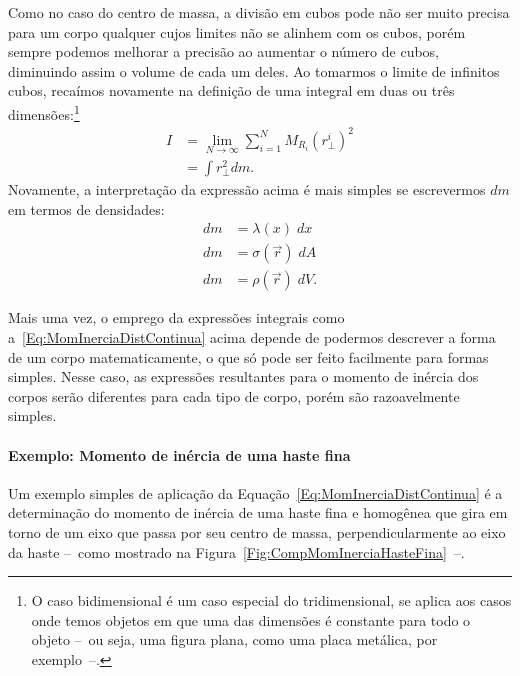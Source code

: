 Como no caso do centro de massa, a divisão em cubos pode não ser muito precisa para um corpo qualquer cujos limites não se alinhem com os cubos, porém sempre podemos melhorar a precisão ao aumentar o número de cubos, diminuindo assim o volume de cada um deles. Ao tomarmos o limite de infinitos cubos, recaímos novamente na definição de uma integral em duas ou três dimensões:\footnote{O caso bidimensional é um caso especial do tridimensional, se aplica aos casos onde temos objetos em que uma das dimensões é constante para todo o objeto --~ou seja, uma figura plana, como uma placa metálica, por exemplo~--.}
\begin{align}
    I &= \lim_{N \to \infty} \sum_{i = 1}^N M_{R_i} (r_\perp^i)^2 \\
    &= \int r_\perp^2 dm. \label{Eq:MomInerciaDistContinua}
\end{align}
%
Novamente, a interpretação da expressão acima é mais simples se escrevermos $dm$ em termos de densidades:
\begin{align}
    dm &= \lambda(x) \; dx \\
    dm &= \sigma(\vec{r}) \;dA \\
    dm &= \rho(\vec{r}) \; dV.
\end{align}

Mais uma vez, o emprego da expressões integrais como a~\ref{Eq:MomInerciaDistContinua} acima depende de podermos descrever a forma de um corpo matematicamente, o que só pode ser feito facilmente para formas simples. Nesse caso, as expressões resultantes para o momento de inércia dos corpos serão diferentes para cada tipo de corpo, porém são razoavelmente simples.

\paragraph{Exemplo: Momento de inércia de uma haste fina}

Um exemplo simples de aplicação da Equação~\eqref{Eq:MomInerciaDistContinua} é a determinação do momento de inércia de uma haste fina  e homogênea que gira em torno de um eixo que passa por seu centro de massa, perpendicularmente ao eixo da haste --~como mostrado na Figura~\ref{Fig:CompMomInerciaHasteFina}~--.

